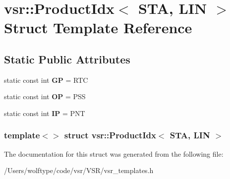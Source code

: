 \hypertarget{structvsr_1_1_product_idx_3_01_s_t_a_00_01_l_i_n_01_4}{\section{vsr\-:\-:Product\-Idx$<$ S\-T\-A, L\-I\-N $>$ Struct Template Reference}
\label{structvsr_1_1_product_idx_3_01_s_t_a_00_01_l_i_n_01_4}
}
\subsection*{Static Public Attributes}
\begin{DoxyCompactItemize}
\item 
\hypertarget{structvsr_1_1_product_idx_3_01_s_t_a_00_01_l_i_n_01_4_a5cc366f86081356f63125b55a2400e02}{static const int {\bfseries G\-P} = R\-T\-C}\label{structvsr_1_1_product_idx_3_01_s_t_a_00_01_l_i_n_01_4_a5cc366f86081356f63125b55a2400e02}

\item 
\hypertarget{structvsr_1_1_product_idx_3_01_s_t_a_00_01_l_i_n_01_4_a31931c29d41628fb57066d371c8c6e8d}{static const int {\bfseries O\-P} = P\-S\-S}\label{structvsr_1_1_product_idx_3_01_s_t_a_00_01_l_i_n_01_4_a31931c29d41628fb57066d371c8c6e8d}

\item 
\hypertarget{structvsr_1_1_product_idx_3_01_s_t_a_00_01_l_i_n_01_4_a77036aa2aa3477bbfea14e70327729cd}{static const int {\bfseries I\-P} = P\-N\-T}\label{structvsr_1_1_product_idx_3_01_s_t_a_00_01_l_i_n_01_4_a77036aa2aa3477bbfea14e70327729cd}

\end{DoxyCompactItemize}
\subsubsection*{template$<$$>$ struct vsr\-::\-Product\-Idx$<$ S\-T\-A, L\-I\-N $>$}



The documentation for this struct was generated from the following file\-:\begin{DoxyCompactItemize}
\item 
/\-Users/wolftype/code/vsr/\-V\-S\-R/vsr\-\_\-templates.\-h\end{DoxyCompactItemize}
